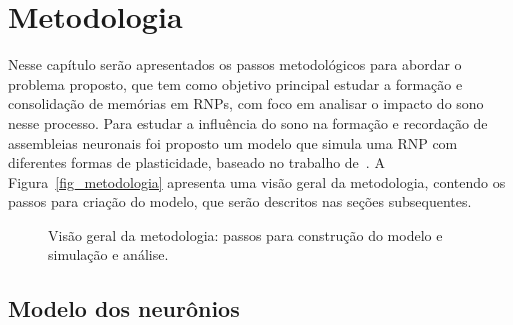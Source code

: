 \chapter{Metodologia}\label{cap_metodologia}

Nesse capítulo serão apresentados os passos metodológicos para abordar o problema proposto, que tem como objetivo principal
estudar a formação e consolidação de memórias em RNPs, com foco em analisar o impacto do sono nesse processo. Para estudar a
influência do sono na formação e recordação de assembleias neu\-ro\-nais foi proposto um modelo que simula uma RNP com diferentes
formas de plasticidade, baseado no trabalho de~. A Figura~\ref{fig_metodologia} apresenta uma visão
geral da metodologia, contendo os passos para criação do modelo, que serão descritos nas seções subsequentes.

\begin{figure}[!ht]
\caption{Visão geral da metodologia: passos para construção do modelo e simulação e análise.}
\end{figure}


\section{Modelo dos neurônios}\label{sec_modelo_neuronios}

